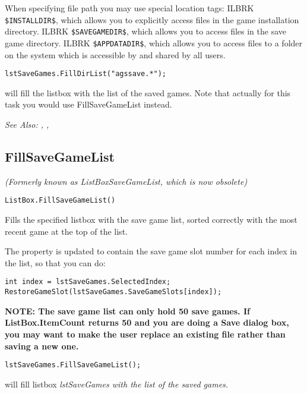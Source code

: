 When specifying file path you may use special location tags: ILBRK
\verb^$INSTALLDIR$^, which allows you to explicitly access files in the game installation directory. ILBRK
\verb^$SAVEGAMEDIR$^, which allows you to access files in the save game directory. ILBRK
\verb^$APPDATADIR$^, which allows you to access files to a folder on the system which
is accessible by and shared by all users.

\begin{verbatim}
lstSaveGames.FillDirList("agssave.*");
\end{verbatim}
will fill the listbox with the list of the saved games. Note that actually for this
task you would use FillSaveGameList instead.

\it{See Also:} , ,


\subsection{FillSaveGameList}\label{ListBox.FillSaveGameList}%

\it{(Formerly known as ListBoxSaveGameList, which is now obsolete)}

\begin{verbatim}
ListBox.FillSaveGameList()
\end{verbatim}
Fills the specified listbox with the save game list, sorted correctly
with the most recent game at the top of the list.

The  property is updated to
contain the save game slot number for each index in the list, so that you can do:
\begin{verbatim}
int index = lstSaveGames.SelectedIndex;
RestoreGameSlot(lstSaveGames.SaveGameSlots[index]);
\end{verbatim}
\bf{NOTE:} The save game list can only hold 50 save games. If ListBox.ItemCount
returns 50 and you are doing a Save dialog box, you may want to make the
user replace an existing file rather than saving a new one.

\begin{verbatim}
lstSaveGames.FillSaveGameList();
\end{verbatim}
will fill listbox \it{lstSaveGames} with the list of the saved games.

